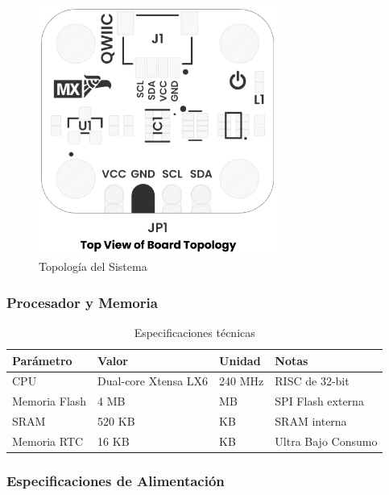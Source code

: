 \documentclass[11pt,a4paper]{article}
\begin{document}
\begin{figure}[H]
\centering
\includegraphics[width=0.7\textwidth]{es_unit_topology_v_1_0_0_icp10111_barometric_pressure_sensor.png}
\caption{Topología del Sistema}
\label{fig:es-unit-topology-v-1-0-0-icp10111-barometric-pressure-sensor-png}
\end{figure}



\subsubsection{Procesador y Memoria}


\begin{table}[H]
\centering
\small
\begin{tabular}{|l|l|l|l|}
\hline
Parámetro & Valor & Unidad & Notas \\
\hline
CPU & Dual-core Xtensa LX6 & 240 MHz & RISC de 32-bit \\
Memoria Flash & 4 MB & MB & SPI Flash externa \\
SRAM & 520 KB & KB & SRAM interna \\
Memoria RTC & 16 KB & KB & Ultra Bajo Consumo \\
\hline
\end{tabular}
\caption{Especificaciones técnicas}
\end{table}


\subsubsection{Especificaciones de Alimentación}
\end{document}
